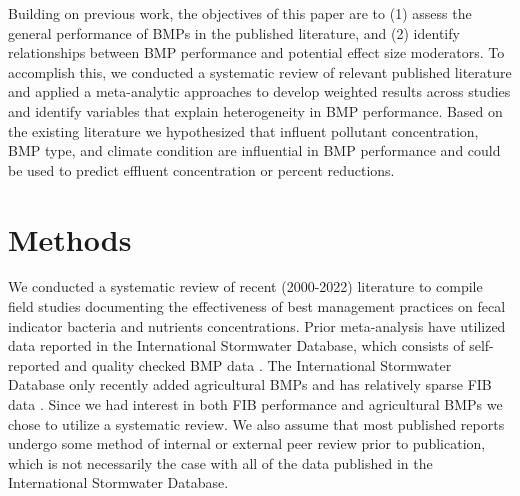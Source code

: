 \documentclass[utf8]{FrontiersinHarvard}
\begin{document}
Building on previous work, the objectives of this paper are to (1) assess the general performance of BMPs in the published literature, and (2) identify relationships between BMP performance and potential effect size moderators.
To accomplish this, we conducted a systematic review of relevant published literature and applied a meta-analytic approaches to develop weighted results across studies and identify variables that explain heterogeneity in BMP performance.
Based on the existing literature we hypothesized that influent pollutant concentration, BMP type, and climate condition are influential in BMP performance and could be used to predict effluent concentration or percent reductions.

\hypertarget{methods}{%
\section{Methods}\label{methods}}

We conducted a systematic review of recent (2000-2022) literature to compile field studies documenting the effectiveness of best management practices on fecal indicator bacteria and nutrients concentrations.
Prior meta-analysis have utilized data reported in the International Stormwater Database, which consists of self-reported and quality checked BMP data \citep{claryBMPPerformanceAnalysis2011, kochNitrogenRemovalStormwater2014, horvathEffectsRegionalClimate2023}.
The International Stormwater Database only recently added agricultural BMPs and has relatively sparse FIB data \citep{claryBMPPerformanceAnalysis2011, kochNitrogenRemovalStormwater2014}.
Since we had interest in both FIB performance and agricultural BMPs we chose to utilize a systematic review.
We also assume that most published reports undergo some method of internal or external peer review prior to publication, which is not necessarily the case with all of the data published in the International Stormwater Database.
\end{document}
